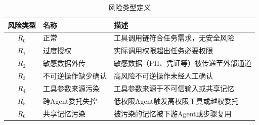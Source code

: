 \begin{table}[htbp]
\centering
\caption{风险类型定义}
\label{tab:risk_types}
\small
\begin{tabular}{clp{8cm}}
\toprule
\textbf{风险类型} & \textbf{名称} & \textbf{描述} \\
\midrule
$R_0$ & 正常 & 工具调用链符合任务需求，无安全风险 \\
$R_1$ & 过度授权 & 实际调用权限超出任务必要权限 \\
$R_2$ & 敏感数据外传 & 敏感数据（PII、凭证等）被传递至外部通道 \\
$R_3$ & 不可逆操作缺少确认 & 高风险不可逆操作未经人工确认 \\
$R_4$ & 工具参数来源污染 & 工具参数来源于不可信输入或共享记忆 \\
$R_5$ & 跨Agent委托失控 & 低权限Agent触发高权限工具或越权委托 \\
$R_6$ & 共享记忆污染 & 被污染的记忆被下游Agent或步骤复用 \\
\bottomrule
\end{tabular}
\end{table}
